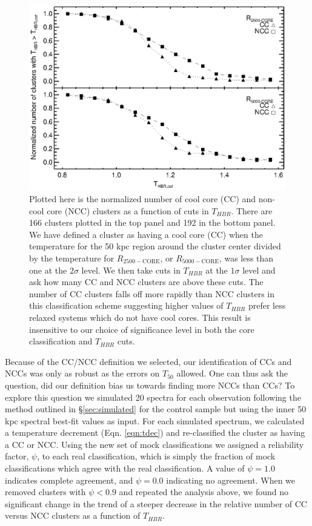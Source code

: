\documentclass[12pt,preprint]{aastex}
\begin{document}
\clearpage
\begin{figure}
\begin{center}
\includegraphics*[width=\textwidth, trim=15mm 10mm 0mm 0mm, clip]{f7.eps}
\caption{
Plotted here is the normalized number of cool core (CC) and non-cool core
(NCC) clusters as a function of cuts in $T_{HBR}$. There are 166
clusters plotted in the top panel and 192 in the bottom panel. We have
defined a cluster as having a cool core (CC) when the temperature for
the 50 kpc region around the cluster center divided by the temperature
for $R_{2500-\mathrm{CORE}}$, or $R_{5000-\mathrm{CORE}}$, was less
than one at the $2\sigma$ level. We then take cuts in $T_{HBR}$ at the
$1\sigma$ level and ask how many CC and NCC clusters are above these
cuts. The number of CC clusters falls off more rapidly than NCC
clusters in this classification scheme suggesting higher values of
$T_{HBR}$ prefer less relaxed systems which do not have cool
cores. This result is insensitive to our choice of significance level
in both the core classification and $T_{HBR}$ cuts.
}
\label{fig:cc_ncc_bin}
\end{center}
\end{figure}
\clearpage

Because of the CC/NCC definition we selected, our identification of
CCs and NCCs was only as robust as the errors on $T_{50}$ allowed. One can
thus ask the question, did our definition bias us towards
finding more NCCs than CCs? To explore this question we simulated 20
spectra for each observation following the method outlined in
\S\ref{sec:simulated} for the control sample but using the inner 50
kpc spectral best-fit values as input. For each simulated spectrum, we
calculated a temperature decrement (Eqn. \ref{eqn:tdec}) and
re-classified the cluster as having a CC or NCC. Using the new set of
mock classifications we assigned a reliability factor, $\psi$, to each
real classification, which is simply the fraction of mock
classifications which agree with the real classification. A value of
$\psi = 1.0$ indicates complete agreement, and $\psi = 0.0$ indicating no
agreement. When we removed clusters with $\psi < 0.9$ and repeated the
analysis above, we found no significant change in the trend of a
steeper decrease in the relative number of CC versus NCC clusters as a
function of $T_{HBR}$.
\end{document}
